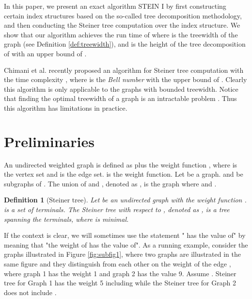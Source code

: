 \documentclass[preprint,12pt]{elsarticle}
\newtheorem{definition}{Definition}
\begin{document}
In this paper, we present an exact algorithm STEIN I  by first constructing 
certain index structures based on the so-called tree decomposition methodology,
and then conducting  the Steiner tree computation 
over the index structure.
We show that our algorithm achieves the run time of
 where  is the treewidth of the graph (see Definition \ref{def:treewidth}),
 and  is the height of the tree decomposition
of  with an upper bound of .


Chimani et al. \cite{ChimaniMZ12} recently proposed an algorithm for Steiner tree computation
with the time complexity  
, where 
 is the \emph{Bell number} with the upper bound of . 
Clearly this algorithm is only applicable to the graphs with bounded treewidth.
Notice that finding the optimal treewidth of a graph is an intractable problem \cite{Bodlaender93atourist}.
Thus
this algorithm has limitations in practice.



\section{Preliminaries}
\label{sec:pre}
An undirected weighted graph is defined as  plus the weight function , where  is the vertex set and  is the edge set.  is the weight function. 
Let  be a graph.  and  be subgraphs
of . The union of  and , denoted as ,
is the graph  where  and .



\begin{definition} [Steiner tree]
Let   be an undirected graph with the weight function .  
is a set of terminals. The Steiner tree with respect to ,
denoted as , is a tree 
spanning the terminals, where  is minimal.
\end{definition}

If the context is clear, we will  sometimes use the statement  " has the value of" by meaning that "the weight of  has the value of".
As a running example, consider the graphs illustrated in  Figure \ref{fig:subfig1},
where two graphs are illustrated in the same figure and they distinguish from each other on the 
weight of the edge , where graph 1 has the weight 1 and graph 2 has the value  9.
Assume  .
Steiner tree for Graph 1 has the weight 5 including  while the Steiner tree for Graph 2 does not include .



\begin{figure*}[ht]
 \centering
\label{fig:subfigureExample}
\caption{Example graphs with  as terminals and the tree decomposition.
}
 \label{fig:running}      
\end{figure*}
\end{document}
